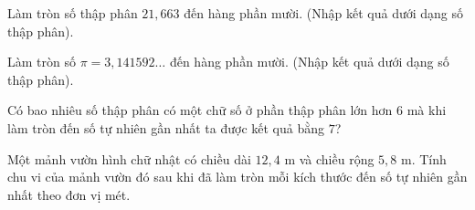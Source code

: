 \begin{ex} %
Làm tròn số thập phân $21{,}663$ đến hàng phần mười. (Nhập kết quả dưới dạng số thập phân).
\end{ex}

\begin{ex} %
Làm tròn số $\pi = 3{,}141592\dots$ đến hàng phần mười. (Nhập kết quả dưới dạng số thập phân).
\end{ex}

\begin{ex} %
Có bao nhiêu số thập phân có một chữ số ở phần thập phân lớn hơn $6$ mà khi làm tròn đến số tự nhiên gần nhất ta được kết quả bằng $7$?
\end{ex}

\begin{ex} %
Một mảnh vườn hình chữ nhật có chiều dài $12{,}4\text{ m}$ và chiều rộng $5{,}8\text{ m}$. Tính chu vi của mảnh vườn đó sau khi đã làm tròn mỗi kích thước đến số tự nhiên gần nhất theo đơn vị mét.
\end{ex}
